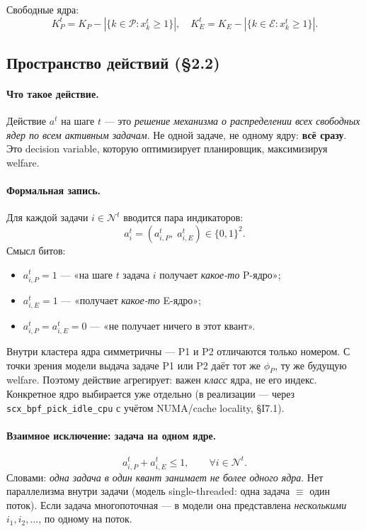 \documentclass[11pt,a4paper]{article}
\begin{document}
Свободные ядра:
\[
K_P^t = K_P - |\{k\in\mathcal{P}: x_k^t\geq 1\}|,\quad
K_E^t = K_E - |\{k\in\mathcal{E}: x_k^t\geq 1\}|.
\]

\subsection{Пространство действий (§2.2)}

\paragraph{Что такое действие.}
Действие $a^t$ на шаге $t$ — это \emph{решение механизма о
распределении всех свободных ядер по всем активным задачам}. Не
одной задаче, не одному ядру: \textbf{всё сразу}. Это decision
variable, которую оптимизирует планировщик, максимизируя welfare.

\paragraph{Формальная запись.}
Для каждой задачи $i\in\mathcal{N}^t$ вводится пара индикаторов:
\[
a_i^t = (a_{i,P}^t,\; a_{i,E}^t) \in \{0,1\}^2.
\]
Смысл битов:
\begin{itemize}
  \item $a_{i,P}^t = 1$ — «на шаге $t$ задача $i$ получает \emph{какое-то} P-ядро»;
  \item $a_{i,E}^t = 1$ — «получает \emph{какое-то} E-ядро»;
  \item $a_{i,P}^t = a_{i,E}^t = 0$ — «не получает ничего в этот квант».
\end{itemize}

\begin{why}
Внутри кластера ядра симметричны — P1 и P2 отличаются только
номером. С точки зрения модели выдача задаче P1 или P2 даёт
тот же $\phi_P$, ту же будущую welfare. Поэтому действие
агрегирует: важен \emph{класс} ядра, не его индекс. Конкретное
ядро выбирается уже отдельно (в реализации — через
\texttt{scx\_bpf\_pick\_idle\_cpu} с учётом NUMA/cache locality,
§I7.1).
\end{why}

\paragraph{Взаимное исключение: задача на одном ядре.}
\[
a_{i,P}^t + a_{i,E}^t \leq 1,\qquad \forall i\in\mathcal{N}^t.
\]
Словами: \emph{одна задача в один квант занимает не более одного
ядра}. Нет параллелизма внутри задачи (модель single-threaded:
одна задача $\equiv$ один поток). Если задача многопоточная — в
модели она представлена \emph{несколькими} $i_1,i_2,\ldots$, по
одному на поток.
\end{document}
